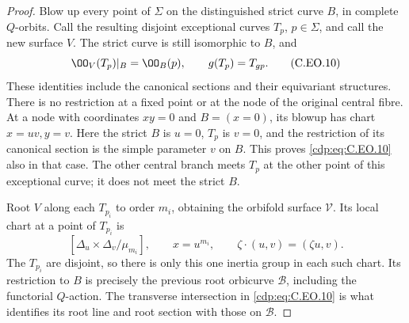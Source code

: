 \begin{proof}
Blow up every point of $\Sigma$ on the
distinguished strict curve $B$, in complete
$Q$-orbits. Call the resulting disjoint
exceptional curves $T_p$, $p\in\Sigma$,
and call the new surface $V$. The strict
curve is still isomorphic to $B$, and
\[
 \OO_V(T_p)|_B=\OO_B(p),\qquad
                     g(T_p)=T_{gp}.                \tag{C.EO.10}\label{cdp:eq:C.EO.10}
\]
These identities include the canonical
sections and their equivariant structures.
There is no restriction at a fixed point
or at the node of the original central
fibre. At a node with coordinates $xy=0$
and $B=(x=0)$, its blowup has chart
$x=uv,y=v$. Here the strict $B$ is
$u=0$, $T_p$ is $v=0$, and the
restriction of its canonical section
is the simple parameter $v$ on $B$.
This proves \eqref{cdp:eq:C.EO.10} also in that case.
The other central branch meets $T_p$
at the other point of this exceptional
curve; it does not meet the strict $B$.

Root $V$ along each $T_{p_i}$ to order
$m_i$, obtaining the orbifold surface
$\mathcal V$. Its local chart at a
point of $T_{p_i}$ is
\[
 [\Delta_u\times\Delta_v/\mu_{m_i}],
           \qquad x=u^{m_i},\qquad
           \zeta\cdot(u,v)=(\zeta u,v).
                                                               \tag{C.EO.11}\label{cdp:eq:C.EO.11}
\]
The $T_{p_i}$ are disjoint, so there
is only this one inertia group in
each such chart. Its restriction to
$B$ is precisely the previous root
orbicurve $\mathcal B$, including the
functorial $Q$-action. The transverse
intersection in \eqref{cdp:eq:C.EO.10} is what
identifies its root line and root
section with those on $\mathcal B$.


\end{proof}
